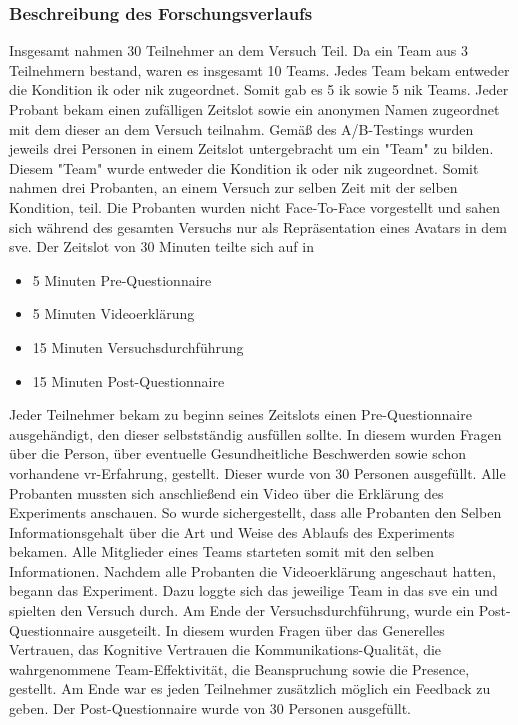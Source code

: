 \documentclass[a4paper,11pt]{article}%
\renewcommand{\\}{\vspace*{0.5\baselineskip} \newline}
\begin{document}
	\subsubsection{Beschreibung des Forschungsverlaufs}
Insgesamt nahmen 30 Teilnehmer an dem Versuch Teil. Da ein Team aus 3 Teilnehmern bestand, waren es insgesamt 10 Teams. Jedes Team bekam entweder die Kondition \ac{ik} oder \ac{nik} zugeordnet. Somit gab es 5 \ac{ik} sowie 5 \ac{nik} Teams.
Jeder Probant bekam einen zufälligen Zeitslot sowie ein anonymen Namen zugeordnet mit dem dieser an dem Versuch teilnahm. Gemäß des A/B-Testings wurden jeweils drei Personen in einem Zeitslot untergebracht um ein "Team" zu bilden. Diesem "Team" wurde entweder die Kondition \ac{ik} oder \ac{nik} zugeordnet. Somit nahmen drei Probanten, an einem Versuch zur selben Zeit mit der selben Kondition, teil. Die Probanten wurden nicht Face-To-Face vorgestellt und sahen sich während des gesamten Versuchs nur als Repräsentation eines Avatars in dem \ac{sve}. Der Zeitslot von 30 Minuten teilte sich auf in
		\begin{itemize}
			\item 5 Minuten Pre-Questionnaire
			\item 5 Minuten Videoerklärung
			\item 15 Minuten Versuchsdurchführung
			\item 15 Minuten Post-Questionnaire
		\end{itemize}
Jeder Teilnehmer bekam zu beginn seines Zeitslots einen Pre-Questionnaire ausgehändigt, den dieser selbstständig ausfüllen sollte. In diesem wurden Fragen über die \dq{}Person\dq{}, über eventuelle \dq{}Gesundheitliche Beschwerden\dq{} sowie schon vorhandene \dq{}\ac{vr}-Erfahrung\dq{}, gestellt.
Dieser wurde von 30 Personen ausgefüllt.
Alle Probanten mussten sich anschließend ein Video über die Erklärung des Experiments anschauen. So wurde sichergestellt, dass alle Probanten den Selben Informationsgehalt über die Art und Weise des Ablaufs des Experiments bekamen. Alle Mitglieder eines Teams starteten somit mit den selben Informationen.
Nachdem alle Probanten die Videoerklärung angeschaut hatten, begann das Experiment. Dazu loggte sich das jeweilige Team in das \ac{sve} ein und spielten den Versuch durch.
		Am Ende der Versuchsdurchführung, wurde ein Post-Questionnaire ausgeteilt. In diesem wurden Fragen über das \dq{}Generelles Vertrauen\dq{}, das \dq{}Kognitive Vertrauen\dq{} die \dq{}Kommunikations-Qualität\dq{}, die wahrgenommene \dq{}Team-Effektivität\dq{}, die \dq{}Beanspruchung\dq{} sowie die \dq{}Presence\dq{}, gestellt. Am Ende war es jeden Teilnehmer zusätzlich möglich ein Feedback zu geben. Der Post-Questionnaire wurde von 30 Personen ausgefüllt. 
		
\end{document}

